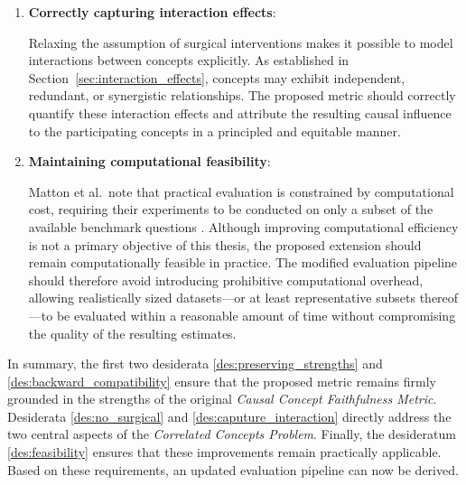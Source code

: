 \begin{enumerate}[label=\textbf{D\arabic*}]
    As argued in Section~\ref{sec:pratical_limit}, the assumption that every concept can be intervened upon independently constitutes the principal limitation of the original metric. The proposed extension should therefore no longer rely on the existence of surgical interventions. Instead, whenever there is reason to assume that a concept cannot be meaningfully intervened upon in isolation, the evaluation procedure should explicitly account for this limitation.

    \item \label{des:caputure_interaction} \textbf{Correctly capturing interaction effects}:
    
    Relaxing the assumption of surgical interventions makes it possible to model interactions between concepts explicitly. As established in Section~\ref{sec:interaction_effects}, concepts may exhibit independent, redundant, or synergistic relationships. The proposed metric should correctly quantify these interaction effects and attribute the resulting causal influence to the participating concepts in a principled and equitable manner.

    \item \label{des:feasibility} \textbf{Maintaining computational feasibility}:
    
    Matton et al.\ note that practical evaluation is constrained by computational cost, requiring their experiments to be conducted on only a subset of the available benchmark questions \cite{mattonWalkTalkMeasuring2024}. Although improving computational efficiency is not a primary objective of this thesis, the proposed extension should remain computationally feasible in practice. The modified evaluation pipeline should therefore avoid introducing prohibitive computational overhead, allowing realistically sized datasets—or at least representative subsets thereof—to be evaluated within a reasonable amount of time without compromising the quality of the resulting estimates.
\end{enumerate}

In summary, the first two desiderata \ref{des:preserving_strengths} and \ref{des:backward_compatibility} ensure that the proposed metric remains firmly grounded in the strengths of the original \emph{Causal Concept Faithfulness Metric}. Desiderata \ref{des:no_surgical} and \ref{des:caputure_interaction} directly address the two central aspects of the \emph{Correlated Concepts Problem}. Finally, the desideratum \ref{des:feasibility} ensures that these improvements remain practically applicable. Based on these requirements, an updated evaluation pipeline can now be derived.


